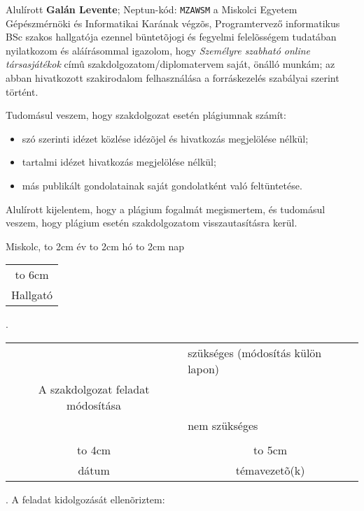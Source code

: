 Alulírott \textbf{Galán Levente}; Neptun-kód: \texttt{MZAWSM} a Miskolci Egyetem Gépészmérnöki és Informatikai Karának végzõs, Programtervező informatikus BSc szakos hallgatója ezennel büntetõjogi és fegyelmi felelõsségem tudatában nyilatkozom és aláírásommal igazolom, hogy
\textit{
Személyre szabható online társasjátékok
}
címû szakdolgozatom/diplomatervem saját, önálló munkám; az abban hivatkozott szakirodalom
felhasználása a forráskezelés szabályai szerint történt.

Tudomásul veszem, hogy szakdolgozat esetén plágiumnak számít:
\begin{itemize}
\item szó szerinti idézet közlése idézõjel és hivatkozás megjelölése nélkül;
\item tartalmi idézet hivatkozás megjelölése nélkül;
\item más publikált gondolatainak saját gondolatként való feltüntetése.
\end{itemize}

Alulírott kijelentem, hogy a plágium fogalmát megismertem, és tudomásul veszem, hogy
plágium esetén szakdolgozatom visszautasításra kerül.

\vspace*{3cm}

\noindent Miskolc, \hbox to 2cm{\dotfill} év \hbox to 2cm{\dotfill} hó \hbox to 2cm{\dotfill} nap

\vspace*{3cm}

\hspace*{8cm}\begin{tabular}{c}
\hbox to 6cm{\dotfill}\\
Hallgató
\end{tabular}



\newpage

.

\begin{tabular}{cl}
	&szükséges (módosítás külön lapon) \\
	A szakdolgozat feladat módosítása& \\
	& nem szükséges\\
	&\\
	\hbox to 4cm{\dotfill}&\multicolumn{1}{c}{\hbox to 5cm{\dotfill}}\\
	dátum& \multicolumn{1}{c}{témavezetõ(k)}
\end{tabular}
\vskip1.5mm

. A feladat kidolgozását ellenõriztem:

